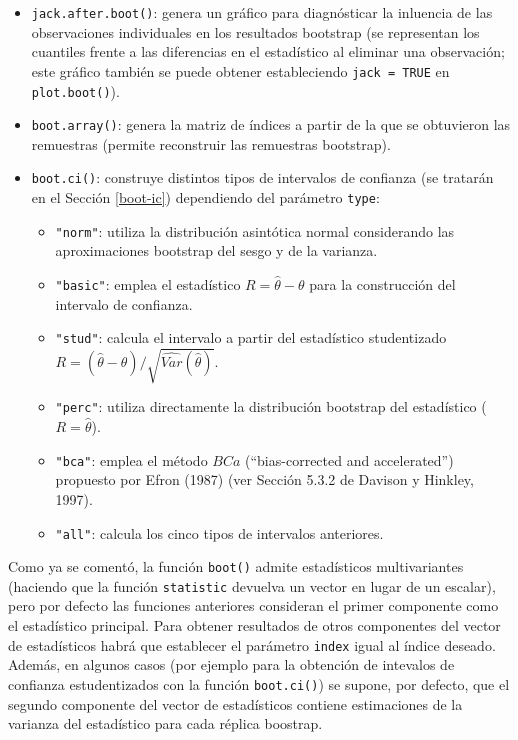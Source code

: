 \documentclass[
  spanish,
  10pt,
]{book}
\theoremstyle{break}
\theoremstyle{nonumberplain}
\begin{document}
\begin{itemize}
\item
  \texttt{jack.after.boot()}: genera un gráfico para diagnósticar la inluencia
  de las observaciones individuales en los resultados bootstrap
  (se representan los cuantiles frente a las diferencias en el estadístico
  al eliminar una observación; este gráfico también se puede obtener estableciendo
  \texttt{jack\ =\ TRUE} en \texttt{plot.boot()}).
\item
  \texttt{boot.array()}: genera la matriz de índices a partir de la que se obtuvieron las remuestras (permite reconstruir las remuestras bootstrap).
\item
  \texttt{boot.ci()}: construye distintos tipos de intervalos de confianza
  (se tratarán en el Sección \ref{boot-ic}) dependiendo del parámetro \texttt{type}:

  \begin{itemize}
  \item
    \texttt{"norm"}: utiliza la distribución asintótica normal considerando las
    aproximaciones bootstrap del sesgo y de la varianza.
  \item
    \texttt{"basic"}: emplea el estadístico \(R = \hat \theta - \theta\) para la
    construcción del intervalo de confianza.
  \item
    \texttt{"stud"}: calcula el intervalo a partir del estadístico studentizado
    \(R = \left( \hat \theta - \theta \right) / \sqrt{\widehat{Var}(\hat \theta)}\).
  \item
    \texttt{"perc"}: utiliza directamente la distribución bootstrap del estadístico
    (\(R = \hat \theta\)).
  \item
    \texttt{"bca"}: emplea el método \(BCa\) (``bias-corrected and accelerated'')
    propuesto por Efron (1987) (ver Sección 5.3.2 de Davison y Hinkley, 1997).
  \item
    \texttt{"all"}: calcula los cinco tipos de intervalos anteriores.
  \end{itemize}
\end{itemize}

Como ya se comentó, la función \texttt{boot()} admite estadísticos multivariantes
(haciendo que la función \texttt{statistic} devuelva un vector en lugar de un escalar),
pero por defecto las funciones anteriores consideran el primer componente
como el estadístico principal.
Para obtener resultados de otros componentes del vector de estadísticos
habrá que establecer el parámetro \texttt{index} igual al índice deseado.
Además, en algunos casos (por ejemplo para la obtención de intevalos de confianza
estudentizados con la función \texttt{boot.ci()}) se supone, por defecto, que el segundo
componente del vector de estadísticos contiene estimaciones de la varianza del
estadístico para cada réplica boostrap.
\end{document}
